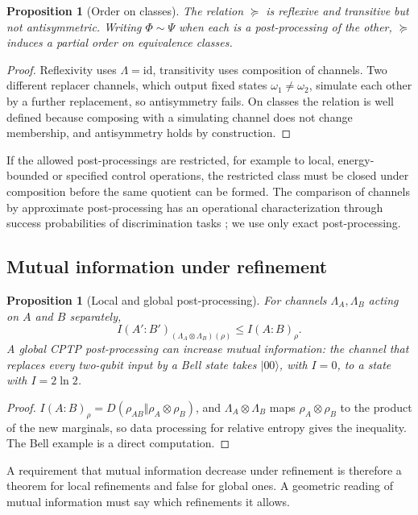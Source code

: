 \documentclass[12pt,a4paper]{article}
\newtheorem{proposition}[theorem]{Proposition}
\begin{document}
\begin{proposition}[Order on classes]
\label{prop:order}
The relation $\succeq$ is reflexive and transitive but not antisymmetric. Writing $\Phi\sim\Psi$ when each is a post-processing of the other, $\succeq$ induces a partial order on equivalence classes.
\end{proposition}

\begin{proof}
Reflexivity uses $\Lambda=\mathrm{id}$, transitivity uses composition of channels. Two different replacer channels, which output fixed states $\omega_1\ne\omega_2$, simulate each other by a further replacement, so antisymmetry fails. On classes the relation is well defined because composing with a simulating channel does not change membership, and antisymmetry holds by construction.
\end{proof}

If the allowed post-processings are restricted, for example to local, energy-bounded or specified control operations, the restricted class must be closed under composition before the same quotient can be formed. The comparison of channels by approximate post-processing has an operational characterization through success probabilities of discrimination tasks \cite{Jencova2015}; we use only exact post-processing.

\subsection{Mutual information under refinement}

\begin{proposition}[Local and global post-processing]
\label{prop:mi}
For channels $\Lambda_A,\Lambda_B$ acting on $A$ and $B$ separately,
\[
I(A':B')_{(\Lambda_A\otimes\Lambda_B)(\rho)}\le I(A:B)_\rho .
\]
A global CPTP post-processing can increase mutual information: the channel that replaces every two-qubit input by a Bell state takes $|00\rangle$, with $I=0$, to a state with $I=2\ln2$.
\end{proposition}

\begin{proof}
$I(A:B)_\rho=D(\rho_{AB}\Vert\rho_A\otimes\rho_B)$, and $\Lambda_A\otimes\Lambda_B$ maps $\rho_A\otimes\rho_B$ to the product of the new marginals, so data processing for relative entropy gives the inequality. The Bell example is a direct computation.
\end{proof}

A requirement that mutual information decrease under refinement is therefore a theorem for local refinements and false for global ones. A geometric reading of mutual information must say which refinements it allows.
\end{document}
